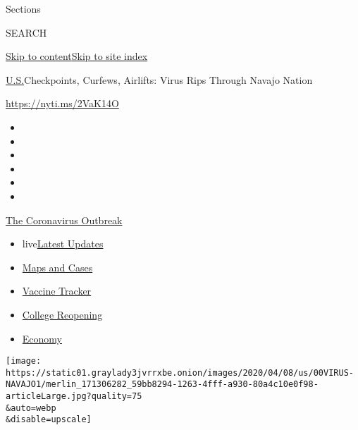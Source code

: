 Sections

SEARCH

\protect\hyperlink{site-content}{Skip to
content}\protect\hyperlink{site-index}{Skip to site index}

\href{/section/us}{U.S.}\textbar{}Checkpoints, Curfews, Airlifts: Virus
Rips Through Navajo Nation

\url{https://nyti.ms/2VaK14O}

\begin{itemize}
\item
\item
\item
\item
\item
\item
\end{itemize}

\href{https://www.nytimes3xbfgragh.onion/news-event/coronavirus?action=click\&pgtype=Article\&state=default\&region=TOP_BANNER\&context=storylines_menu}{The
Coronavirus Outbreak}

\begin{itemize}
\tightlist
\item
  live\href{https://www.nytimes3xbfgragh.onion/2020/08/04/world/coronavirus-cases.html?action=click\&pgtype=Article\&state=default\&region=TOP_BANNER\&context=storylines_menu}{Latest
  Updates}
\item
  \href{https://www.nytimes3xbfgragh.onion/interactive/2020/us/coronavirus-us-cases.html?action=click\&pgtype=Article\&state=default\&region=TOP_BANNER\&context=storylines_menu}{Maps
  and Cases}
\item
  \href{https://www.nytimes3xbfgragh.onion/interactive/2020/science/coronavirus-vaccine-tracker.html?action=click\&pgtype=Article\&state=default\&region=TOP_BANNER\&context=storylines_menu}{Vaccine
  Tracker}
\item
  \href{https://www.nytimes3xbfgragh.onion/2020/08/02/us/covid-college-reopening.html?action=click\&pgtype=Article\&state=default\&region=TOP_BANNER\&context=storylines_menu}{College
  Reopening}
\item
  \href{https://www.nytimes3xbfgragh.onion/live/2020/08/04/business/stock-market-today-coronavirus?action=click\&pgtype=Article\&state=default\&region=TOP_BANNER\&context=storylines_menu}{Economy}
\end{itemize}

\texttt{[image: https://static01.graylady3jvrrxbe.onion/images/2020/04/08/us/00VIRUS-NAVAJO1/merlin\_171306282\_59bb8294-1263-4fff-a930-80a4c10e0f98-articleLarge.jpg?quality=75\\\&auto=webp\\\&disable=upscale]}

